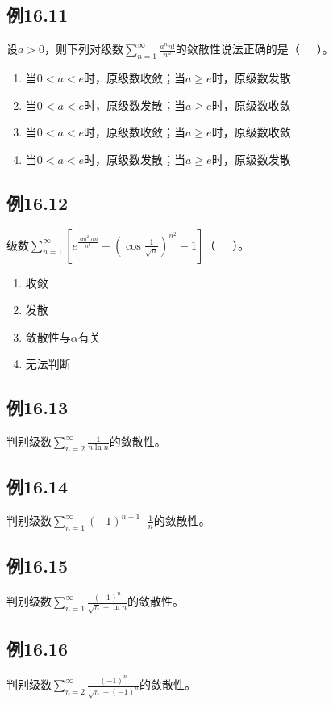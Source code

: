 \documentclass[UTF8]{ctexart}
\theoremstyle{remark}
\begin{document}
\begin{multicols}{2}
	\subsection*{例16.11}
	设\(a > 0\)，则下列对级数\(\sum_{n = 1}^{\infty}\frac{a^{n}n!}{n^{n}}\)的敛散性说法正确的是（~~~）。
	\begin{enumerate}[label=(\Alph*)]
		\item 当\(0 < a < e\)时，原级数收敛；当\(a\geqslant e\)时，原级数发散
		\item 当\(0 < a < e\)时，原级数发散；当\(a\geqslant e\)时，原级数收敛
		\item 当\(0 < a < e\)时，原级数收敛；当\(a\geqslant e\)时，原级数收敛
		\item 当\(0 < a < e\)时，原级数发散；当\(a\geqslant e\)时，原级数发散
	\end{enumerate}
	
	\subsection*{例16.12}
	级数\(\sum_{n = 1}^{\infty}\left[e^{\frac{\sin^{2}\alpha n}{n^{2}}}+\left(\cos\frac{1}{\sqrt{n}}\right)^{n^{2}} - 1\right]\)（~~~）。
	\begin{enumerate}[label=(\Alph*)]
		\item 收敛
		\item 发散
		\item 敛散性与\(\alpha\)有关
		\item 无法判断
	\end{enumerate}
	
	\subsection*{例16.13}
	判别级数\(\sum_{n = 2}^{\infty}\frac{1}{n\ln n}\)的敛散性。
	
	\subsection*{例16.14}
	判别级数\(\sum_{n = 1}^{\infty}(-1)^{n - 1}\cdot\frac{1}{n}\)的敛散性。
	
	\subsection*{例16.15}
	判别级数\(\sum_{n = 1}^{\infty}\frac{(-1)^{n}}{\sqrt{n}-\ln n}\)的敛散性。
	
	\subsection*{例16.16}
	判别级数\(\sum_{n = 2}^{\infty}\frac{(-1)^{n}}{\sqrt{n}+(-1)^{n}}\)的敛散性。
	

\end{multicols}
\end{document}
